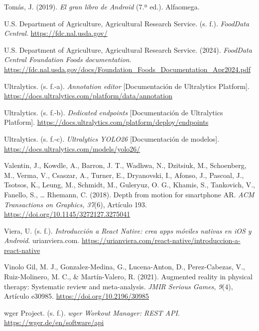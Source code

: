 \begin{referenciasapa}
\item Tomás, J. (2019). \textit{El gran libro de Android} (7.ª ed.). Alfaomega.

\item U.S. Department of Agriculture, Agricultural Research Service. (s. f.). \textit{FoodData Central}. \url{https://fdc.nal.usda.gov/}

\item U.S. Department of Agriculture, Agricultural Research Service. (2024). \textit{FoodData Central Foundation Foods documentation}. \url{https://fdc.nal.usda.gov/docs/Foundation_Foods_Documentation_Apr2024.pdf}

\item Ultralytics. (s. f.-a). \textit{Annotation editor} [Documentación de Ultralytics Platform]. \url{https://docs.ultralytics.com/platform/data/annotation}

\item Ultralytics. (s. f.-b). \textit{Dedicated endpoints} [Documentación de Ultralytics Platform]. \url{https://docs.ultralytics.com/platform/deploy/endpoints}

\item Ultralytics. (s. f.-c). \textit{Ultralytics YOLO26} [Documentación de modelos]. \url{https://docs.ultralytics.com/models/yolo26/}

\item Valentin, J., Kowdle, A., Barron, J. T., Wadhwa, N., Dzitsiuk, M., Schoenberg, M., Verma, V., Csaszar, A., Turner, E., Dryanovski, I., Afonso, J., Pascoal, J., Tsotsos, K., Leung, M., Schmidt, M., Guleryuz, O. G., Khamis, S., Tankovich, V., Fanello, S., \ldots{} Rhemann, C. (2018). Depth from motion for smartphone AR. \textit{ACM Transactions on Graphics, 37}(6), Artículo 193. \url{https://doi.org/10.1145/3272127.3275041}

\item Viera, U. (s. f.). \textit{Introducción a React Native: crea apps móviles nativas en iOS y Android}. urianviera.com. \url{https://urianviera.com/react-native/introduccion-a-react-native}

\item Vinolo Gil, M. J., Gonzalez-Medina, G., Lucena-Anton, D., Perez-Cabezas, V., Ruiz-Molinero, M. C., \& Martín-Valero, R. (2021). Augmented reality in physical therapy: Systematic review and meta-analysis. \textit{JMIR Serious Games, 9}(4), Artículo e30985. \url{https://doi.org/10.2196/30985}

\item wger Project. (s. f.). \textit{wger Workout Manager: REST API}. \url{https://wger.de/en/software/api}


\end{referenciasapa}
